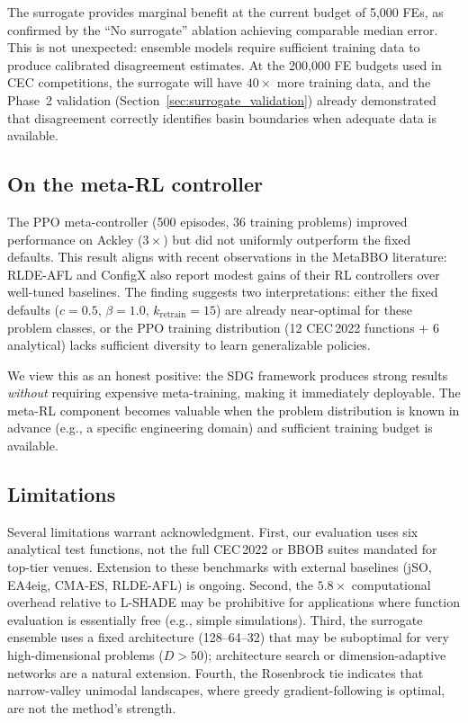 \documentclass[preprint,12pt,number]{elsarticle}
\begin{document}
The surrogate provides marginal benefit at the current budget of 5{,}000 FEs, as confirmed by the ``No surrogate'' ablation achieving comparable median error. This is not unexpected: ensemble models require sufficient training data to produce calibrated disagreement estimates. At the 200{,}000 FE budgets used in CEC competitions, the surrogate will have $40\times$ more training data, and the Phase~2 validation (Section~\ref{sec:surrogate_validation}) already demonstrated that disagreement correctly identifies basin boundaries when adequate data is available.

\subsection{On the meta-RL controller}

The PPO meta-controller (500 episodes, 36 training problems) improved performance on Ackley ($3\times$) but did not uniformly outperform the fixed defaults. This result aligns with recent observations in the MetaBBO literature: RLDE-AFL \cite{Guo2025} and ConfigX \cite{Guo2024configx} also report modest gains of their RL controllers over well-tuned baselines. The finding suggests two interpretations: either the fixed defaults ($c = 0.5$, $\beta = 1.0$, $k_{\text{retrain}} = 15$) are already near-optimal for these problem classes, or the PPO training distribution (12 CEC\,2022 functions + 6 analytical) lacks sufficient diversity to learn generalizable policies.

We view this as an honest positive: the SDG framework produces strong results \emph{without} requiring expensive meta-training, making it immediately deployable. The meta-RL component becomes valuable when the problem distribution is known in advance (e.g., a specific engineering domain) and sufficient training budget is available.

\subsection{Limitations}

Several limitations warrant acknowledgment. First, our evaluation uses six analytical test functions, not the full CEC\,2022 or BBOB suites mandated for top-tier venues. Extension to these benchmarks with external baselines (jSO, EA4eig, CMA-ES, RLDE-AFL) is ongoing. Second, the $5.8\times$ computational overhead relative to L-SHADE may be prohibitive for applications where function evaluation is essentially free (e.g., simple simulations). Third, the surrogate ensemble uses a fixed architecture (128--64--32) that may be suboptimal for very high-dimensional problems ($D > 50$); architecture search or dimension-adaptive networks are a natural extension. Fourth, the Rosenbrock tie indicates that narrow-valley unimodal landscapes, where greedy gradient-following is optimal, are not the method's strength.
\end{document}
